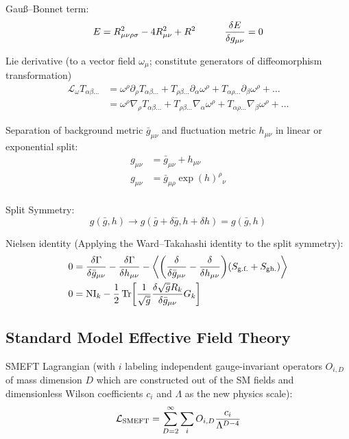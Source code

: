 		\noindent
		Gauß--Bonnet term:
		\begin{equation}
			E = R_{\mu\nu\rho\sigma}^2 - 4 R_{\mu\nu}^2 + R^2
			\hsp \fdv{E}{g_{\mu\nu}} = 0
		\end{equation}

		\noindent
		Lie derivative (\wrt to a vector field $\omega_\mu$; constitute generators of diffeomorphism transformation)
		\begin{equation}
			\begin{aligned}
				\mathcal{L}_\omega T_{\alpha\beta\dots}
				&= \omega^\rho \partial_\rho T_{\alpha\beta\dots} + T_{\rho\beta\dots} \partial_\alpha \omega^\rho + T_{\alpha\rho\dots} \partial_\beta \omega^\rho + \dots \\
				&= \omega^\rho \nabla_\rho T_{\alpha\beta\dots} + T_{\rho\beta\dots} \nabla_\alpha \omega^\rho + T_{\alpha\rho\dots} \nabla_\beta \omega^\rho + \dots
			\end{aligned}
		\end{equation}

		\noindent
		Separation of background metric $\bar{g}_{\mu\nu}$ and fluctuation metric $h_{\mu\nu}$ in linear or exponential split:
		\begin{align}
			g_{\mu\nu} &= \bar{g}_{\mu\nu} + h_{\mu\nu} \\
			g_{\mu\nu} &= \bar{g}_{\mu\rho}\exp(h)^\rho{}_{\nu} \\
		\end{align}

		\noindent
		Split Symmetry:
		\begin{equation}
			g(\bar{g},h) \to g(\bar{g}+\delta \bar{g}, h + \delta h) = g(\bar{g},h)
		\end{equation}

		\noindent
		Nielsen identity (Applying the Ward--Takahashi identity to the split symmetry):
		\begin{align}
			0 &= \fdv{\Gamma}{\bar{g}_{\mu\nu}} - \fdv{\Gamma}{h_{\mu\nu}} - \Avg{\qty(\fdv{\bar{g}_{\mu\nu}} - \fdv{h_{\mu\nu}})(S_\text{g.f.} + S_\text{gh.})} \\
			0 &= \mathrm{NI}_k - \frac{1}{2} \tr[\frac{1}{\sqrt{\bar{g}}} \fdv{\sqrt{\bar{g}}R_k}{\bar{g}_{\mu\nu}}G_k]
		\end{align}

	\subsection{Standard Model Effective Field Theory}
		SMEFT Lagrangian (with $i$ labeling independent gauge-invariant operators $O_{i,D}$ of mass dimension $D$ which are constructed out of the SM fields and dimensionless Wilson coefficients $c_i$ and $\Lambda$ as the new physics scale):
		\begin{equation}
			\mathcal{L}_{\mathrm{SMEFT}} = \sum_{D=2}^{\infty} \sum_{i} O_{i,D} \frac{c_i}{\Lambda^{D-4}}
		\end{equation}

